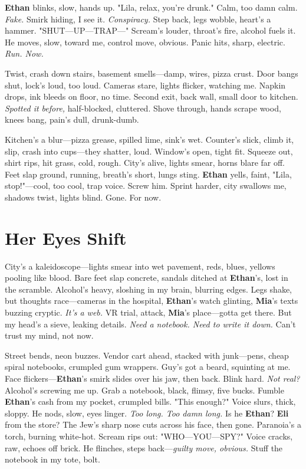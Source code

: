 \documentclass{article}
\begin{document}
\textbf{Ethan} blinks, slow, hands up. "Lila, relax, you’re drunk." Calm, too damn calm. \textit{Fake.} Smirk hiding, I see it. \textit{Conspiracy.} Step back, legs wobble, heart’s a hammer. "SHUT—UP—TRAP—" Scream’s louder, throat’s fire, alcohol fuels it. He moves, slow, toward me, control move, obvious. Panic hits, sharp, electric. \textit{Run. Now.}

Twist, crash down stairs, basement smells—damp, wires, pizza crust. Door bangs shut, lock’s loud, too loud. Cameras stare, lights flicker, watching me. Napkin drops, ink bleeds on floor, no time. Second exit, back wall, small door to kitchen. \textit{Spotted it before,} half-blocked, cluttered. Shove through, hands scrape wood, knees bang, pain’s dull, drunk-dumb.

Kitchen’s a blur—pizza grease, spilled lime, sink’s wet. Counter’s slick, climb it, slip, crash into cups—they shatter, loud. Window’s open, tight fit. Squeeze out, shirt rips, hit grass, cold, rough. City’s alive, lights smear, horns blare far off. Feet slap ground, running, breath’s short, lungs sting. \textbf{Ethan} yells, faint, "Lila, stop!"—cool, too cool, trap voice. Screw him. Sprint harder, city swallows me, shadows twist, lights blind. Gone. For now.

\section*{Her Eyes Shift}

City’s a kaleidoscope—lights smear into wet pavement, reds, blues, yellows pooling like blood. Bare feet slap concrete, sandals ditched at \textbf{Ethan}’s, lost in the scramble. Alcohol’s heavy, sloshing in my brain, blurring edges. Legs shake, but thoughts race—cameras in the hospital, \textbf{Ethan}’s watch glinting, \textbf{Mia}’s texts buzzing cryptic. \textit{It’s a web.} VR trial, attack, \textbf{Mia}’s place—gotta get there. But my head’s a sieve, leaking details. \textit{Need a notebook. Need to write it down.} Can’t trust my mind, not now.

Street bends, neon buzzes. Vendor cart ahead, stacked with junk—pens, cheap spiral notebooks, crumpled gum wrappers. Guy’s got a beard, squinting at me. Face flickers—\textbf{Ethan}’s smirk slides over his jaw, then back. Blink hard. \textit{Not real?} Alcohol’s screwing me up. Grab a notebook, black, flimsy, five bucks. Fumble \textbf{Ethan}’s cash from my pocket, crumpled bills. "This enough?" Voice slurs, thick, sloppy. He nods, slow, eyes linger. \textit{Too long. Too damn long.} Is he \textbf{Ethan}? \textbf{Eli} from the store? The Jew’s sharp nose cuts across his face, then gone. Paranoia’s a torch, burning white-hot. Scream rips out: "WHO—YOU—SPY?" Voice cracks, raw, echoes off brick. He flinches, steps back—\textit{guilty move, obvious.} Stuff the notebook in my tote, bolt.
\end{document}
